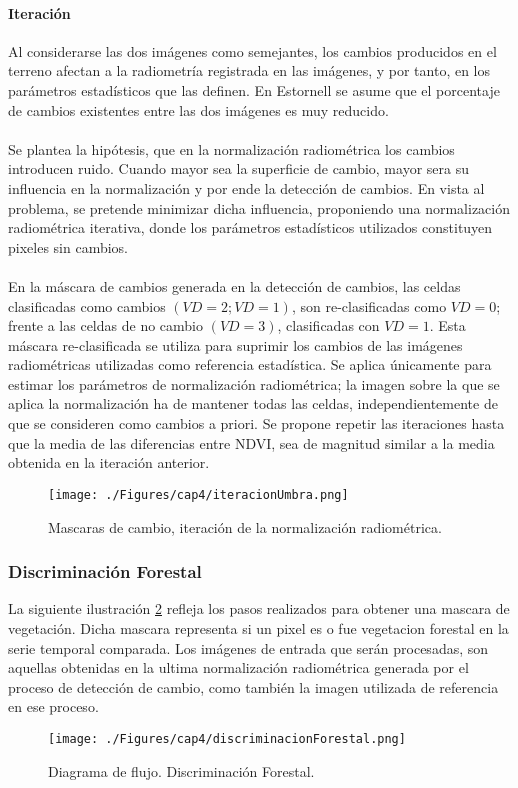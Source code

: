 \paragraph{Iteraci\'on}
Al considerarse las dos im\'agenes como semejantes, los cambios producidos en el terreno afectan a la radiometría registrada en las imágenes, y por tanto, en los parámetros estadísticos que las definen. En Estornell\cite{estornell2004analisis} se asume que el porcentaje de cambios existentes entre las dos im\'agenes es muy reducido.\\~\\
Se plantea la hip\'otesis, que en la normalizaci\'on radiom\'etrica los cambios introducen ruido. Cuando mayor sea la superficie de cambio, mayor sera su influencia en la normalizaci\'on y por ende la detecci\'on de cambios. En vista al problema, se pretende minimizar dicha influencia, proponiendo una normalizaci\'on radiom\'etrica iterativa, donde los par\'ametros estad\'isticos utilizados constituyen pixeles sin cambios. \\~\\
En la máscara de cambios generada en la detección de cambios, las celdas clasificadas como cambios $ (VD = 2; VD = 1) $, son re-clasificadas como $ VD=0 $; frente a las celdas de no cambio $(VD = 3)  $, clasificadas con $ VD=1 $. Esta máscara re-clasificada se utiliza para suprimir los cambios de las im\'agenes radiom\'etricas utilizadas como referencia estad\'istica. Se aplica \'unicamente para estimar los par\'ametros de normalizaci\'on radiom\'etrica; la imagen sobre la que se aplica la normalizaci\'on ha de mantener todas las
celdas, independientemente de que se consideren como cambios a priori. Se propone repetir las iteraciones hasta que la media de las diferencias entre NDVI, sea de magnitud similar a la media obtenida en la iteraci\'on anterior. 
	\begin{figure}[H]
		\centering
		\texttt{[image: ./Figures/cap4/iteracionUmbra.png]}
		\caption{Mascaras de cambio, iteraci\'on de la normalizaci\'on radiom\'etrica.}
		\label{fig:umbrales}
	\end{figure}


\subsubsection{Discriminaci\'on Forestal}
La siguiente ilustraci\'on \ref{fig:discrimForestal} refleja los pasos realizados para obtener una mascara de vegetaci\'on. Dicha mascara representa si un pixel es o fue vegetacion forestal en la serie temporal comparada. Los im\'agenes de entrada que ser\'an procesadas, son aquellas obtenidas en la ultima normalizaci\'on radiom\'etrica generada por el proceso de detecci\'on de cambio, como tambi\'en la imagen utilizada de referencia en ese proceso.
\begin{figure}[H]
	\centering
	\texttt{[image: ./Figures/cap4/discriminacionForestal.png]}
	\caption{Diagrama de flujo. Discriminaci\'on Forestal.}
	\label{fig:discrimForestal}
\end{figure}

